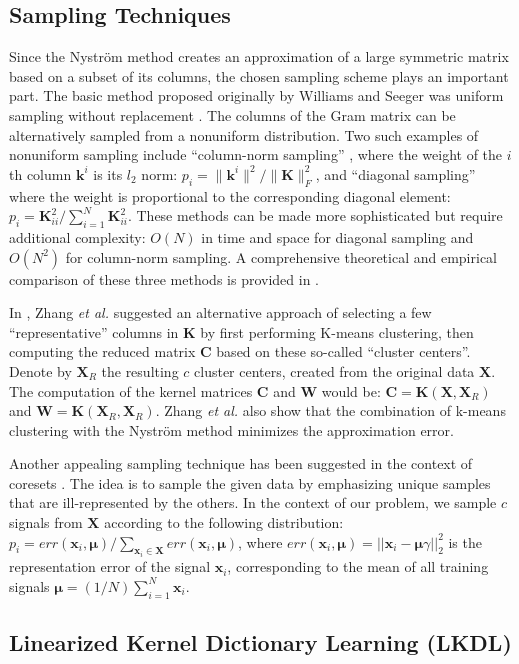\documentclass[journal]{IEEEtran}
\newcommand{\bx}{\mathbf{x}}
\newcommand{\bk}{\mathbf{k}}
\newcommand{\bX}{\mathbf{X}}
\newcommand{\bK}{\mathbf{K}}
\newcommand{\bC}{\mathbf{C}}
\newcommand{\bW}{\mathbf{W}}
\begin{document}
\subsection{Sampling Techniques} \label{SS:SamplingNystrom}
Since the Nystr\"{o}m method creates an approximation of a large symmetric matrix based on a subset of its columns, the chosen sampling scheme plays an important part. The basic method proposed originally by Williams and Seeger was uniform sampling without replacement \cite{Nystrom}. The columns of the Gram matrix can be alternatively sampled from a nonuniform distribution. Two such examples of nonuniform sampling include ``column-norm sampling'' \cite{ColumnNormSampling}, where the weight of the $i$th column $\bk^i$ is its $l_2$ norm: $p_i=\|\bk^i\|^2 / \|\bK\|_F^2$, and ``diagonal sampling'' \cite{DiagonalSampling} where the weight is proportional to the corresponding diagonal element: $p_i=\bK_{ii}^2 / \sum_{i=1}^N{\bK_{ii}^2}$. These methods can be made more sophisticated but require additional complexity: $O(N)$ in time and space for diagonal sampling and $O(N^2)$ for column-norm sampling. A comprehensive theoretical and empirical comparison of these three methods is provided in \cite{NystromSample}.

In \cite{KmeansSampling}, Zhang \textit{et al.} suggested an alternative approach of selecting a few ``representative'' columns in $\bK$ by first performing K-means clustering, then computing the reduced matrix $\bC$ based on these so-called ``cluster centers''. Denote by $\bX_R$ the resulting $c$ cluster centers, created from the original data $\bX$. The computation of the kernel matrices $\bC$ and $\bW$ would be: $\bC=\bK(\bX,\bX_R)$ and $\bW=\bK(\bX_R,\bX_R)$. Zhang \textit{et al.} also show that the combination of k-means clustering with the Nystr\"{o}m method minimizes the approximation error.

Another appealing sampling technique has been suggested in the context of coresets \cite{coreset}. The idea is to sample the given data by emphasizing unique samples that are ill-represented by the others. In the context of our problem, we sample $c$ signals from $\bX$ according to the following distribution: $p_i = err(\bx_i,\boldsymbol{\mu})/\sum_{\bx_i \in \bX} err(\bx_i,\boldsymbol{\mu})$, where $err(\bx_i,\boldsymbol{\mu})=||\bx_i - \boldsymbol{\mu} \gamma||_2^2$ is the representation error of the signal $\bx_i$, corresponding to the mean of all training signals $\boldsymbol{\mu}=(1/N)\sum_{i=1}^{N} \bx_i$.

\subsection{Linearized Kernel Dictionary Learning (LKDL)} \label{SS:Algorithm}
\end{document}

